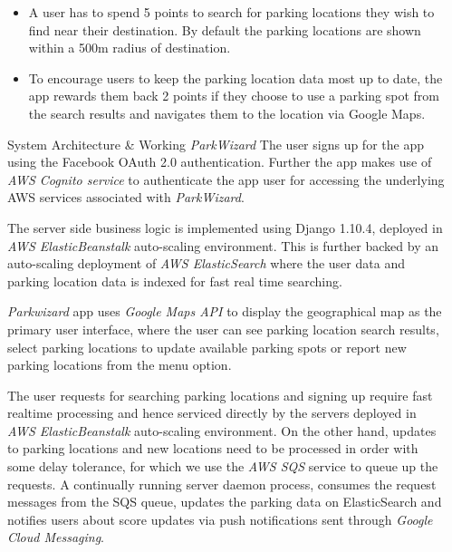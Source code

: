 \documentclass[final]{beamer}
\newlength{\onecolwid}
\newlength{\twocolwid}
\begin{document}
\begin{frame}[t]
\begin{columns}[t]
\begin{column}{\twocolwid}
\end{column} %

\begin{column}{\onecolwid} %

\begin{itemize}
    \item A user has to spend 5 points to search for parking locations they wish to find near their destination. By default the parking locations are shown within a 500m radius of destination.

    \item To encourage users to keep the parking location data most up to date, the app rewards them back 2 points if they choose to use a parking spot from the search results and navigates them to the location via Google Maps.
\end{itemize}

\begin{block}{System Architecture \& Working}
\textit{ParkWizard}
The user signs up for the app using the Facebook OAuth 2.0 authentication. Further the app makes use of \textit{AWS Cognito service} to authenticate the app user for accessing the underlying AWS services associated with \textit{ParkWizard}.\par

The server side business logic is implemented using Django 1.10.4, deployed in \textit{AWS ElasticBeanstalk} auto-scaling environment. This is further backed by an auto-scaling deployment of \textit{AWS ElasticSearch} where the user data and parking location data is indexed for fast real time searching.\par

\textit{Parkwizard} app uses \textit{Google Maps API} to display the geographical map as the primary user interface, where the user can see parking location search results, select parking locations to update available parking spots or report new parking locations from the menu option.\par

The user requests for searching parking locations and signing up require fast realtime processing and hence serviced directly by the servers deployed in \textit{AWS ElasticBeanstalk} auto-scaling environment. On the other hand, updates to parking locations and new locations need to be processed in order with some delay tolerance, for which we use the \textit{AWS SQS} service to queue up the requests. A continually running server daemon process, consumes the request messages from the SQS queue, updates the parking data on ElasticSearch and notifies users about score updates via push notifications sent through \textit{Google Cloud Messaging}.
\end{block}



\end{column}
\end{columns}
\end{frame}
\end{document}
